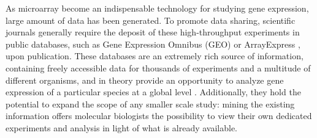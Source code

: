 













As microarray become an indispensable technology for studying gene expression,
large amount of data has been generated.
%
To promote data sharing, scientific journals generally require the deposit of
these high-throughput experiments in public databases, such as Gene Expression
Omnibus (GEO) \cite{Barrett2011} or ArrayExpress \cite{Parkinson2009}, upon
publication.
These databases are an extremely rich source of information, containing freely
accessible data for thousands of experiments and a multitude of different
organisms, and in theory provide an opportunity to analyze gene expression of a
particular species at a global level \cite{Ideker2001}.
%
Additionally, they hold the potential to expand the scope of any smaller scale
study: mining the existing information offers molecular biologists the
possibility to view their own dedicated experiments and analysis in light of
what is already available.



